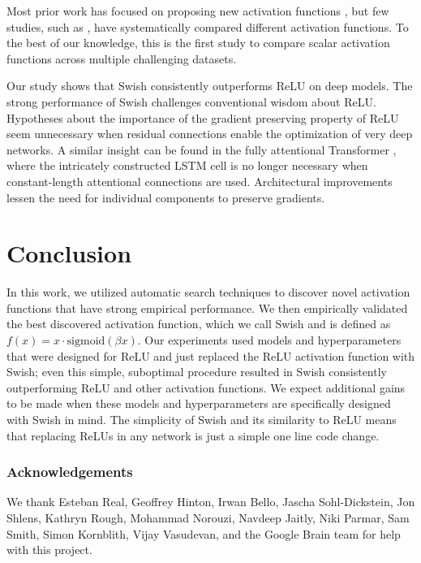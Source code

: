 \documentclass{article} %
\begin{document}
Most prior work has focused on proposing new activation functions \citep{maas2013rectifier,agostinelli2014learning,he2015delving,clevert2015fast,hendrycks2016bridging,klambauer2017self,qiu2017flexible,zhou2017deep,elfwing2017sigmoid}, but few studies, such as \citet{xu2015empirical}, have systematically compared different activation functions. To the best of our knowledge, this is the first study to compare scalar activation functions across multiple challenging datasets.

Our study shows that Swish consistently outperforms ReLU on deep models. The strong performance of Swish challenges conventional wisdom about ReLU. Hypotheses about the importance of the gradient preserving property of ReLU seem unnecessary when residual connections \citep{he2016deep} enable the optimization of very deep networks. A similar insight can be found in the fully attentional Transformer \citep{vaswani2017attention}, where the intricately constructed LSTM cell \citep{hochreiter1997long} is no longer necessary when constant-length attentional connections are used. Architectural improvements lessen the need for individual components to preserve gradients.

\section{Conclusion}
\label{sec:conclusion}

In this work, we utilized automatic search techniques to discover novel activation functions that have strong empirical performance. We then empirically validated the best discovered activation function, which we call Swish and is defined as $f(x) = x \cdot \text{sigmoid}(\beta x)$. Our experiments used models and hyperparameters that were designed for ReLU and just replaced the ReLU activation function with Swish; even this simple, suboptimal procedure resulted in Swish consistently outperforming ReLU and other activation functions. We expect additional gains to be made when these models and hyperparameters are specifically designed with Swish in mind. The simplicity of Swish and its similarity to ReLU means that replacing ReLUs in any network is just a simple one line code change. 

\subsubsection*{Acknowledgements}
We thank Esteban Real, Geoffrey Hinton, Irwan Bello, Jascha Sohl-Dickstein, Jon Shlens, Kathryn Rough, Mohammad Norouzi, Navdeep Jaitly, Niki Parmar, Sam Smith, Simon Kornblith, Vijay Vasudevan, and the Google Brain team for help with this project. 

\small


\end{document}

